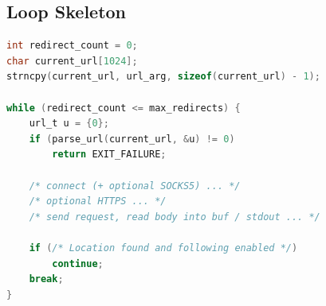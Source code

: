 \subsection{Loop Skeleton}

\begin{lstlisting}[style=snippet,language=C]
int redirect_count = 0;
char current_url[1024];
strncpy(current_url, url_arg, sizeof(current_url) - 1);

while (redirect_count <= max_redirects) {
    url_t u = {0};
    if (parse_url(current_url, &u) != 0)
        return EXIT_FAILURE;

    /* connect (+ optional SOCKS5) ... */
    /* optional HTTPS ... */
    /* send request, read body into buf / stdout ... */

    if (/* Location found and following enabled */)
        continue;
    break;
}
\end{lstlisting}

